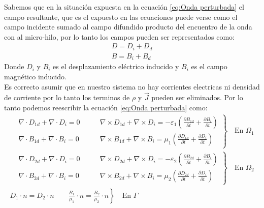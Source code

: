 \documentclass[11pt]{article}
\begin{document}
Sabemos que en la situación expuesta en la ecuación \eqref{eq:Onda perturbada} el campo resultante, que es el expuesto en las ecuaciones puede verse como el campo incidente sumado al campo difundido producto del encuentro de la onda con al micro-hilo, por lo tanto los campos pueden ser representados como:
\begin{equation}
\label{eq:Descomposicion campos}
\begin{split}
D=D_i+D_d\\
B=B_i+B_d
\end{split}
\end{equation}
Donde $D_i$ y $B_i$ es el desplazamiento eléctrico inducido y $B_i$ es el campo magnético inducido.\\
Es correcto asumir que en nuestro sistema no hay corrientes electricas ni densidad de corriente por lo tanto los terminos de $\rho$ y $\vec{J}$ pueden ser eliminados. Por lo tanto podemos reescribir la ecuación \eqref{eq:Onda perturbada} como:
\begin{equation}
\label{eq:Onda perturbada y separada}
\begin{split}
\left.
\begin{aligned}
&\nabla\cdot D_{1d} + \nabla\cdot D_{i} = 0\qquad & \nabla\times D_{1d}+\nabla\times D_i = -\varepsilon_1\left(\frac{\partial B_{1d}}{\partial t}+\frac{\partial B_i}{\partial t}\right)\\
&\nabla\cdot B_{1d} +\nabla\cdot B_i = 0\qquad &  \nabla\times B_{1d}+\nabla\times B_i = \mu_1\left(\frac{\partial D_{1d}}{\partial t}+\frac{\partial D_i}{\partial t}\right)
\end{aligned}
\right\}
\quad\text{En }\Omega_1\\
\left.
\begin{aligned}
&\nabla\cdot D_{2d} + \nabla\cdot D_{i} = 0\qquad & \nabla\times D_{2d}+\nabla\times D_i = -\varepsilon_2\left(\frac{\partial B_{2d}}{\partial t}+\frac{\partial B_i}{\partial t}\right)\\
&\nabla\cdot B_{2d} +\nabla\cdot B_i = 0\qquad &  \nabla\times B_{2d}+\nabla\times B_i = \mu_2\left(\frac{\partial D_{2d}}{\partial t}+\frac{\partial D_i}{\partial t}\right)
\end{aligned}
\right\}
\quad\text{En }\Omega_2\\
\left. 
D_1\cdot n=D_2\cdot n \qquad \frac{B_1}{\mu_1}\cdot n=\frac{B_2}{\mu_2}\cdot n
\right\}
\quad\text{En }\Gamma\\
\end{split}
\end{equation}
\end{document}
